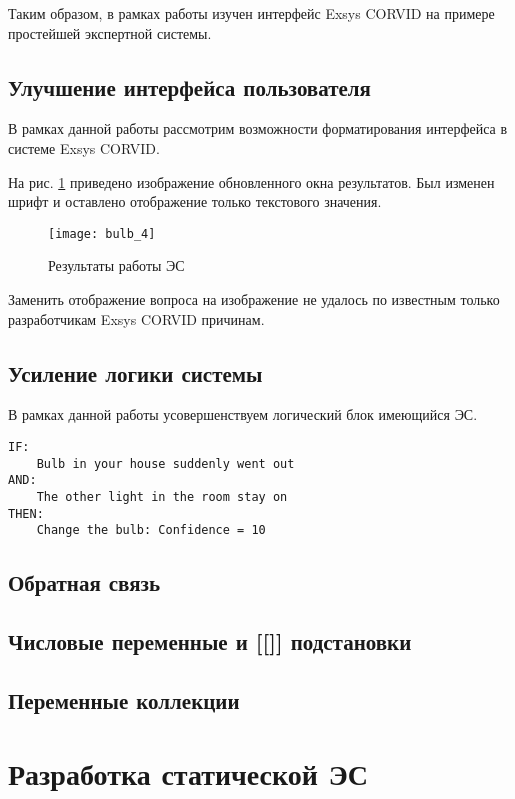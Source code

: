 Таким образом, в рамках работы изучен интерфейс Exsys CORVID на примере простейшей экспертной системы.

\subsection{Улучшение интерфейса пользователя}

В рамках данной работы рассмотрим возможности форматирования интерфейса в системе Exsys CORVID.

На рис. \ref{fig:bulb_4} приведено изображение обновленного окна результатов. Был изменен шрифт и оставлено отображение только текстового значения.

\begin{figure}[H]
	\centering
	\texttt{[image: bulb\_4]}
	\caption{Результаты работы ЭС}
	\label{fig:bulb_4}
\end{figure}

Заменить отображение вопроса на изображение не удалось по известным только разработчикам Exsys CORVID причинам.

\subsection{Усиление логики системы}

В рамках данной работы усовершенствуем логический блок имеющийся ЭС.


\begin{lstlisting}[label=lst:bulb_1, caption={Алгоритм работы ЭС}]
IF:
	Bulb in your house suddenly went out
AND:
	The other light in the room stay on
THEN:
	Change the bulb: Confidence = 10

\end{lstlisting}

\subsection{Обратная связь}

\subsection{Числовые переменные и [[]] подстановки}

\subsection{Переменные коллекции}

\section{Разработка статической ЭС}

